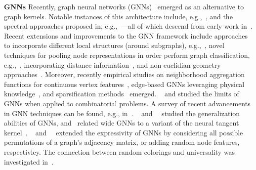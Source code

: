 \documentclass{article}
\newcommand{\xhdr}[1]{{\noindent\bfseries #1}}
\theoremstyle{definition}
\begin{document}
\xhdr{GNNs}
Recently, graph neural networks (GNNs)~\cite{Gil+2017,Sca+2009} emerged as an alternative to graph kernels. Notable instances of this architecture include, e.g.,~\cite{Duv+2015,Fey+2018,Ham+2017,Vel+2018}, and the spectral approaches proposed in, e.g.,~\cite{Bru+2014,Def+2015,Kip+2017,Mon+2017}---all of which descend from early work in~\cite{Kir+1995,Mer+2005,Spe+1997,Sca+2009}. Recent extensions and improvements to the GNN framework include approaches to incorporate different local structures (around subgraphs), e.g.,~\cite{Hai+2019,Fla+2020,Jin+2020,Nie+2016,Xu+2018}, novel techniques for pooling node representations in order perform graph classification, e.g.,~\cite{Can+2018,Gao+2019,Yin+2018,Zha+2018}, incorporating distance information~\cite{You+2019}, and non-euclidian geometry approaches~\cite{Cha+2019}. Moreover, recently empirical studies on neighborhood aggregation functions for continuous vertex features~\cite{Cor+2020}, edge-based GNNs leveraging physical knowledge~\cite{And+2019,Kli+2020}, and sparsification methods~\cite{Ron+2020} emerged. \citeauthor{Loukas20}~\cite{Loukas20} and \citeauthor{Sat+2019} studied the limits of GNNs when applied to combinatorial problems. A survey of recent advancements in GNN techniques can be found, e.g., in~\cite{Cha+2020,Wu+2019,Zho+2018}. \citeauthor{Gar+2020}~\cite{Gar+2020} and~\citeauthor{Ver+2019}~\cite{Ver+2019} studied the generalization abilities of GNNs, and~\cite{Du+2019} related wide GNNs to a variant of the neural tangent kernel~\cite{Aro+2019,Jac+2020}. \citeauthor{Mur+2019}~\cite{Mur+2019a,Mur+2019} and~\citeauthor{Sat+2020}~\cite{Sat+2020} extended the expressivity of GNNs by considering all possible permutations of a graph’s adjacency matrix, or adding random node features, respectivley. The connection between random colorings and universality was investigated in~\cite{Das+2020}.
\end{document}
